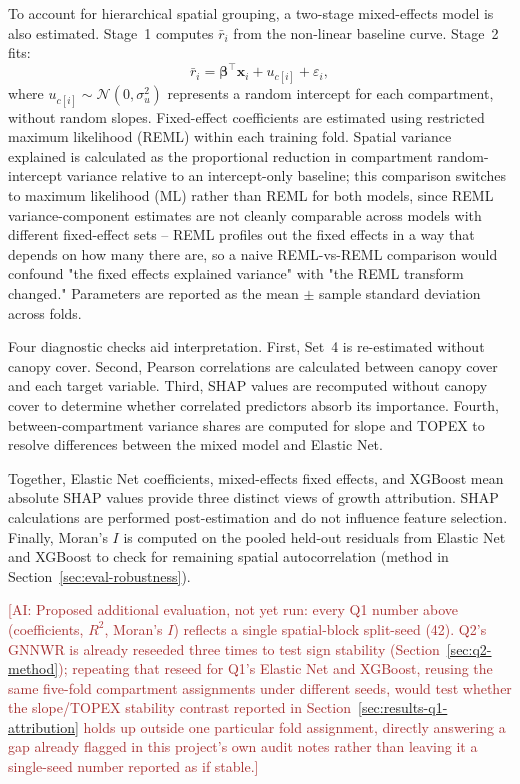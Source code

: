\documentclass[logo,msc,ai]{infthesis}           %
\newcommand{\ai}[1]{\textcolor{brown}{[AI: #1]}}
\begin{document}
To account for hierarchical spatial grouping, a two-stage mixed-effects model is also estimated. Stage~1 computes $\bar r_i$ from the non-linear baseline curve. Stage~2 fits:
\begin{equation}
\bar r_i=\boldsymbol{\beta}^{\top}\mathbf{x}_i+u_{c[i]}+\varepsilon_i,
\label{eq:mixed-effects}
\end{equation}
where $u_{c[i]}\sim\mathcal{N}(0,\sigma_u^2)$ represents a random intercept for each compartment, without random slopes. Fixed-effect coefficients are estimated using restricted maximum likelihood (REML) within each training fold. Spatial variance explained is calculated as the proportional reduction in compartment random-intercept variance relative to an intercept-only baseline; this comparison switches to maximum likelihood (ML) rather than REML for both models, since REML variance-component estimates are not cleanly comparable across models with different fixed-effect sets -- REML profiles out the fixed effects in a way that depends on how many there are, so a naive REML-vs-REML comparison would confound "the fixed effects explained variance" with "the REML transform changed." Parameters are reported as the mean $\pm$ sample standard deviation across folds.

Four diagnostic checks aid interpretation. First, Set~4 is re-estimated without canopy cover. Second, Pearson correlations are calculated between canopy cover and each target variable. Third, SHAP values are recomputed without canopy cover to determine whether correlated predictors absorb its importance. Fourth, between-compartment variance shares are computed for slope and TOPEX to resolve differences between the mixed model and Elastic Net.

Together, Elastic Net coefficients, mixed-effects fixed effects, and XGBoost mean absolute SHAP values provide three distinct views of growth attribution. SHAP calculations are performed post-estimation and do not influence feature selection. Finally, Moran's $I$ is computed on the pooled held-out residuals from Elastic Net and XGBoost to check for remaining spatial autocorrelation (method in Section~\ref{sec:eval-robustness}).

\ai{Proposed additional evaluation, not yet run: every Q1 number above (coefficients, $R^2$, Moran's $I$) reflects a single spatial-block split-seed (42). Q2's GNNWR is already reseeded three times to test sign stability (Section~\ref{sec:q2-method}); repeating that reseed for Q1's Elastic Net and XGBoost, reusing the same five-fold compartment assignments under different seeds, would test whether the slope/TOPEX stability contrast reported in Section~\ref{sec:results-q1-attribution} holds up outside one particular fold assignment, directly answering a gap already flagged in this project's own audit notes rather than leaving it a single-seed number reported as if stable.}
\end{document}
